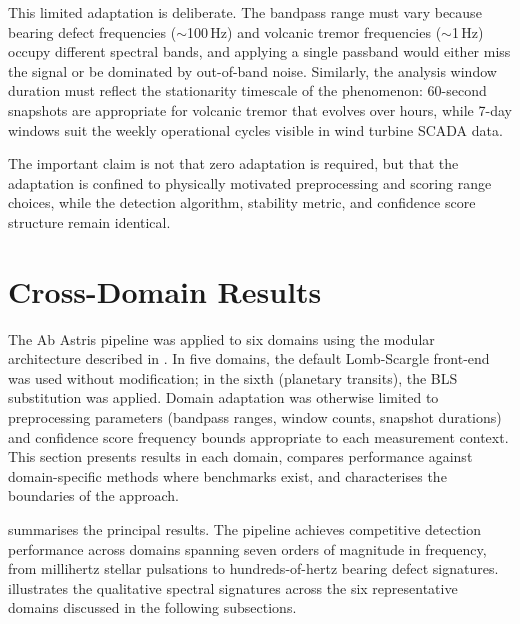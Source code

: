 \documentclass[11pt,a4paper]{article}
\begin{document}
This limited adaptation is deliberate. The bandpass range must vary because bearing defect frequencies (${\sim}$100\,Hz) and volcanic tremor frequencies (${\sim}$1\,Hz) occupy different spectral bands, and applying a single passband would either miss the signal or be dominated by out-of-band noise. Similarly, the analysis window duration must reflect the stationarity timescale of the phenomenon: 60-second snapshots are appropriate for volcanic tremor that evolves over hours, while 7-day windows suit the weekly operational cycles visible in wind turbine SCADA data.

The important claim is not that zero adaptation is required, but that the adaptation is confined to physically motivated preprocessing and scoring range choices, while the detection algorithm, stability metric, and confidence score structure remain identical.


\section{Cross-Domain Results}
\label{sec:results}

The Ab Astris pipeline was applied to six domains using the modular architecture described in . In five domains, the default Lomb-Scargle front-end was used without modification; in the sixth (planetary transits), the BLS substitution was applied. Domain adaptation was otherwise limited to preprocessing parameters (bandpass ranges, window counts, snapshot durations) and confidence score frequency bounds appropriate to each measurement context. This section presents results in each domain, compares performance against domain-specific methods where benchmarks exist, and characterises the boundaries of the approach.

 summarises the principal results. The pipeline achieves competitive detection performance across domains spanning seven orders of magnitude in frequency, from millihertz stellar pulsations to hundreds-of-hertz bearing defect signatures.  illustrates the qualitative spectral signatures across the six representative domains discussed in the following subsections.
\end{document}
